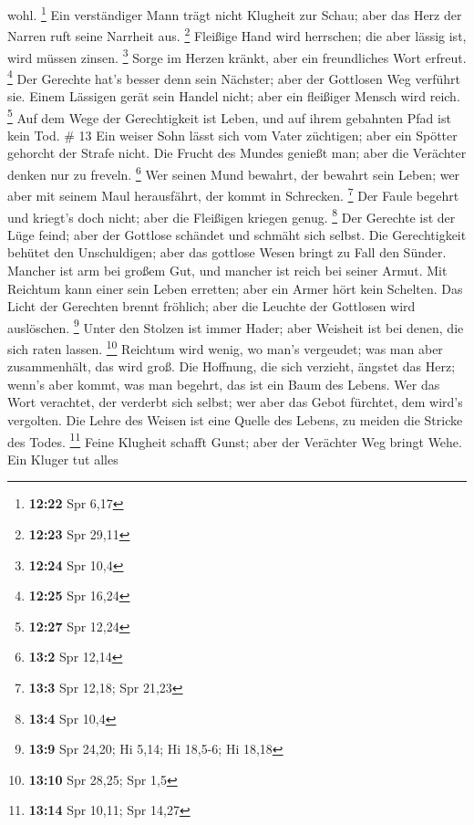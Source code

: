 wohl. \footnote{\textbf{12:22} Spr 6,17}  Ein
verständiger Mann trägt nicht Klugheit zur Schau; aber das Herz der
Narren ruft seine Narrheit aus. \footnote{\textbf{12:23} Spr 29,11}
 Fleißige Hand wird herrschen; die aber lässig ist, wird
müssen zinsen. \footnote{\textbf{12:24} Spr 10,4}  Sorge
im Herzen kränkt, aber ein freundliches Wort erfreut. \footnote{\textbf{12:25}
  Spr 16,24}  Der Gerechte hat's besser denn sein
Nächster; aber der Gottlosen Weg verführt sie.  Einem
Lässigen gerät sein Handel nicht; aber ein fleißiger Mensch wird reich.
\footnote{\textbf{12:27} Spr 12,24}  Auf dem Wege der
Gerechtigkeit ist Leben, und auf ihrem gebahnten Pfad ist kein Tod. \#
13  Ein weiser Sohn lässt sich vom Vater züchtigen; aber
ein Spötter gehorcht der Strafe nicht.  Die Frucht des
Mundes genießt man; aber die Verächter denken nur zu freveln.
\footnote{\textbf{13:2} Spr 12,14}  Wer seinen Mund
bewahrt, der bewahrt sein Leben; wer aber mit seinem Maul herausfährt,
der kommt in Schrecken. \footnote{\textbf{13:3} Spr 12,18; Spr 21,23}
 Der Faule begehrt und kriegt's doch nicht; aber die
Fleißigen kriegen genug. \footnote{\textbf{13:4} Spr 10,4}
 Der Gerechte ist der Lüge feind; aber der Gottlose
schändet und schmäht sich selbst.  Die Gerechtigkeit
behütet den Unschuldigen; aber das gottlose Wesen bringt zu Fall den
Sünder.  Mancher ist arm bei großem Gut, und mancher ist
reich bei seiner Armut.  Mit Reichtum kann einer sein
Leben erretten; aber ein Armer hört kein Schelten.  Das
Licht der Gerechten brennt fröhlich; aber die Leuchte der Gottlosen wird
auslöschen. \footnote{\textbf{13:9} Spr 24,20; Hi 5,14; Hi 18,5-6; Hi
  18,18}  Unter den Stolzen ist immer Hader; aber
Weisheit ist bei denen, die sich raten lassen. \footnote{\textbf{13:10}
  Spr 28,25; Spr 1,5}  Reichtum wird wenig, wo man's
vergeudet; was man aber zusammenhält, das wird groß.  Die
Hoffnung, die sich verzieht, ängstet das Herz; wenn's aber kommt, was
man begehrt, das ist ein Baum des Lebens.  Wer das Wort
verachtet, der verderbt sich selbst; wer aber das Gebot fürchtet, dem
wird's vergolten.  Die Lehre des Weisen ist eine Quelle
des Lebens, zu meiden die Stricke des Todes. \footnote{\textbf{13:14}
  Spr 10,11; Spr 14,27}  Feine Klugheit schafft Gunst;
aber der Verächter Weg bringt Wehe.  Ein Kluger tut alles
